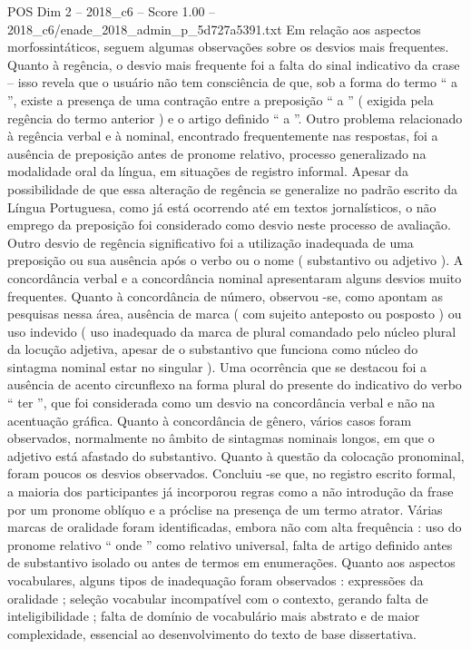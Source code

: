 \begin{textsample}{POS Dim 2 – 2018\_c6 – Score 1.00 – 2018\_c6/enade\_2018\_admin\_p\_5d727a5391.txt}
Em relação aos aspectos morfossintáticos, seguem algumas observações sobre os desvios mais frequentes.
Quanto à regência, o desvio mais frequente foi a falta do sinal indicativo da crase – isso revela que o usuário não tem consciência de que, sob a forma do termo “ a ”, existe a presença de uma contração entre a preposição “ a ” ( exigida pela regência do termo anterior ) e o artigo definido “ a ”.
Outro problema relacionado à regência verbal e à nominal, encontrado frequentemente nas respostas, foi a ausência de preposição antes de pronome relativo, processo generalizado na modalidade oral da língua, em situações de registro informal.
Apesar da possibilidade de que essa alteração de regência se generalize no padrão escrito da Língua Portuguesa, como já está ocorrendo até em textos jornalísticos, o não emprego da preposição foi considerado como desvio neste processo de avaliação.
Outro desvio de regência significativo foi a utilização inadequada de uma preposição ou sua ausência após o verbo ou o nome ( substantivo ou adjetivo ).
A concordância verbal e a concordância nominal apresentaram alguns desvios muito frequentes.
Quanto à concordância de número, observou -se, como apontam as pesquisas nessa área, ausência de marca ( com sujeito anteposto ou posposto ) ou uso indevido ( uso inadequado da marca de plural comandado pelo núcleo plural da locução adjetiva, apesar de o substantivo que funciona como núcleo do sintagma nominal estar no singular ).
Uma ocorrência que se destacou foi a ausência de acento circunflexo na forma plural do presente do indicativo do verbo “ ter ”, que foi considerada como um desvio na concordância verbal e não na acentuação gráfica.
Quanto à concordância de gênero, vários casos foram observados, normalmente no âmbito de sintagmas nominais longos, em que o adjetivo está afastado do substantivo.
Quanto à questão da colocação pronominal, foram poucos os desvios observados.
Concluiu -se que, no registro escrito formal, a maioria dos participantes já incorporou regras como a não introdução da frase por um pronome oblíquo e a próclise na presença de um termo atrator.
Várias marcas de oralidade foram identificadas, embora não com alta frequência : uso do pronome relativo “ onde ” como relativo universal, falta de artigo definido antes de substantivo isolado ou antes de termos em enumerações.
Quanto aos aspectos vocabulares, alguns tipos de inadequação foram observados : expressões da oralidade ; seleção vocabular incompatível com o contexto, gerando falta de inteligibilidade ; falta de domínio de vocabulário mais abstrato e de maior complexidade, essencial ao desenvolvimento do texto de base dissertativa.

\end{textsample}
